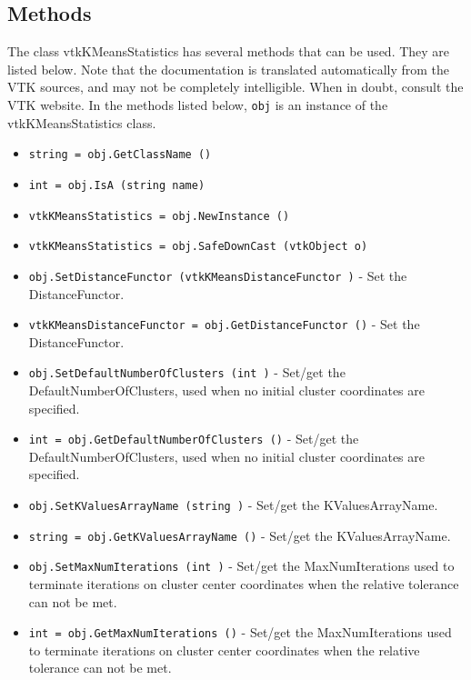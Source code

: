 \subsection{Methods}

The class vtkKMeansStatistics has several methods that can be used.
  They are listed below.
Note that the documentation is translated automatically from the VTK sources,
and may not be completely intelligible.  When in doubt, consult the VTK website.
In the methods listed below, \verb|obj| is an instance of the vtkKMeansStatistics class.
\begin{itemize}
\item  \verb|string = obj.GetClassName ()|

\item  \verb|int = obj.IsA (string name)|

\item  \verb|vtkKMeansStatistics = obj.NewInstance ()|

\item  \verb|vtkKMeansStatistics = obj.SafeDownCast (vtkObject o)|

\item  \verb|obj.SetDistanceFunctor (vtkKMeansDistanceFunctor )| -  Set the DistanceFunctor.

\item  \verb|vtkKMeansDistanceFunctor = obj.GetDistanceFunctor ()| -  Set the DistanceFunctor.

\item  \verb|obj.SetDefaultNumberOfClusters (int )| -  Set/get the  DefaultNumberOfClusters, used when no initial cluster coordinates are specified.

\item  \verb|int = obj.GetDefaultNumberOfClusters ()| -  Set/get the  DefaultNumberOfClusters, used when no initial cluster coordinates are specified.

\item  \verb|obj.SetKValuesArrayName (string )| -  Set/get the KValuesArrayName.

\item  \verb|string = obj.GetKValuesArrayName ()| -  Set/get the KValuesArrayName.

\item  \verb|obj.SetMaxNumIterations (int )| -  Set/get the MaxNumIterations used to terminate iterations on
 cluster center coordinates when the relative tolerance can not be met.

\item  \verb|int = obj.GetMaxNumIterations ()| -  Set/get the MaxNumIterations used to terminate iterations on
 cluster center coordinates when the relative tolerance can not be met.


\end{itemize}
